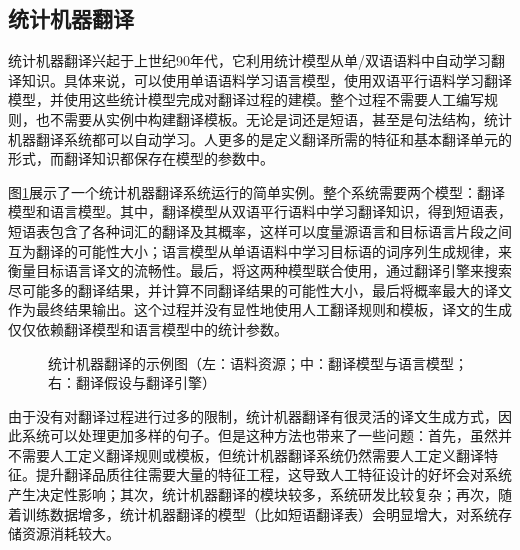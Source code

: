 
\subsection{统计机器翻译}

\parinterval 统计机器翻译兴起于上世纪90年代，它利用统计模型从单/双语语料中自动学习翻译知识。具体来说，可以使用单语语料学习语言模型，使用双语平行语料学习翻译模型，并使用这些统计模型完成对翻译过程的建模。整个过程不需要人工编写规则，也不需要从实例中构建翻译模板。无论是词还是短语，甚至是句法结构，统计机器翻译系统都可以自动学习。人更多的是定义翻译所需的特征和基本翻译单元的形式，而翻译知识都保存在模型的参数中。

\parinterval 图\ref{fig:1-15}展示了一个统计机器翻译系统运行的简单实例。整个系统需要两个模型：翻译模型和语言模型。其中，翻译模型从双语平行语料中学习翻译知识，得到短语表，短语表包含了各种词汇的翻译及其概率，这样可以度量源语言和目标语言片段之间互为翻译的可能性大小；语言模型从单语语料中学习目标语的词序列生成规律，来衡量目标语言译文的流畅性。最后，将这两种模型联合使用，通过翻译引擎来搜索尽可能多的翻译结果，并计算不同翻译结果的可能性大小，最后将概率最大的译文作为最终结果输出。这个过程并没有显性地使用人工翻译规则和模板，译文的生成仅仅依赖翻译模型和语言模型中的统计参数。

\begin{figure}[htp]
    \centering

    \caption{统计机器翻译的示例图（左：语料资源；中：翻译模型与语言模型；右：翻译假设与翻译引擎）}
    \label{fig:1-15}
\end{figure}

\parinterval 由于没有对翻译过程进行过多的限制，统计机器翻译有很灵活的译文生成方式，因此系统可以处理更加多样的句子。但是这种方法也带来了一些问题：首先，虽然并不需要人工定义翻译规则或模板，但统计机器翻译系统仍然需要人工定义翻译特征。提升翻译品质往往需要大量的特征工程，这导致人工特征设计的好坏会对系统产生决定性影响；其次，统计机器翻译的模块较多，系统研发比较复杂；再次，随着训练数据增多，统计机器翻译的模型（比如短语翻译表）会明显增大，对系统存储资源消耗较大。


